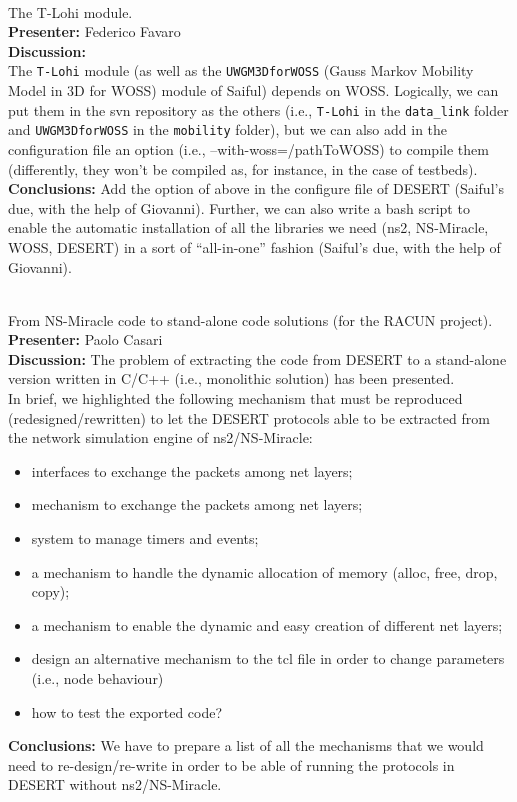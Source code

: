 \documentclass[11pt,journal,draftclsnofoot,onecolumn,twoside,letterpaper]{IEEEtran}
\theoremstyle{definition} \newtheorem{definition}[]{Definition}
\theoremstyle{theorem} \newtheorem{theorem}[]{Theorem}
\begin{document}
\  \\
 The T-Lohi module.\\
{\bf Presenter:} Federico Favaro\\
{\bf Discussion:} \\
The {\tt T-Lohi} module (as well as the {\tt UWGM3DforWOSS} (Gauss Markov Mobility Model in 3D for WOSS) module of Saiful) depends on WOSS. Logically, we can put them in the svn repository as the others (i.e., {\tt T-Lohi} in the {\tt data\_link} folder and  {\tt UWGM3DforWOSS} in the {\tt mobility} folder), but we can also add in the configuration file an option (i.e., --with-woss=/pathToWOSS) to compile them (differently, they won't be compiled as, for instance, in the case of testbeds).\\
{\bf Conclusions:}  Add the option of above in the configure file of DESERT (Saiful's due, with the help of Giovanni). Further, we can also 
write a bash script to enable the automatic installation of all the libraries we need (ns2, NS-Miracle, WOSS, DESERT) in a sort of ``all-in-one'' fashion (Saiful's due, with the help of Giovanni).

\  \\
 From NS-Miracle code to stand-alone code solutions (for the RACUN project).\\
{\bf Presenter:} Paolo Casari\\
{\bf Discussion:} The problem of extracting the code from DESERT to a stand-alone version written in C/C++ (i.e., monolithic solution) has been presented.\\
In brief, we highlighted the following mechanism that must be reproduced (redesigned/rewritten) to let the DESERT protocols able to be extracted from the network simulation engine of ns2/NS-Miracle:
\begin{itemize}
 \item interfaces to exchange the packets among net layers;
 \item mechanism to exchange the packets among net layers;
 \item system to manage timers and events;
 \item a mechanism to handle the dynamic allocation of memory (alloc, free, drop, copy);
 \item a mechanism to enable the dynamic and easy creation of different net layers;
 \item design an alternative mechanism to the tcl file in order to change parameters (i.e., node behaviour)
 \item how to test the exported code?
\end{itemize}
{\bf Conclusions:} We have to prepare a list of all the mechanisms that we would need to re-design/re-write in order to be able of running the protocols in DESERT without ns2/NS-Miracle.  
\end{document}
